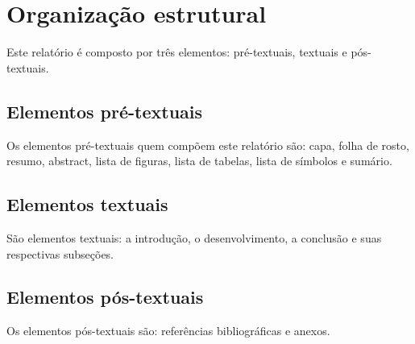 \section{Organização estrutural}

  Este relatório é composto por três elementos: pré-textuais, textuais e pós-textuais.

  \subsection{Elementos pré-textuais}

  Os elementos pré-textuais quem compõem este relatório são: capa, folha de rosto, resumo,
  abstract, lista de figuras, lista de tabelas, lista de símbolos e sumário.

  \subsection{Elementos textuais}

  São elementos textuais: a introdução, o desenvolvimento, a conclusão e suas
  respectivas subseções.

  \subsection{Elementos pós-textuais}

  Os elementos pós-textuais são: referências bibliográficas e anexos.
